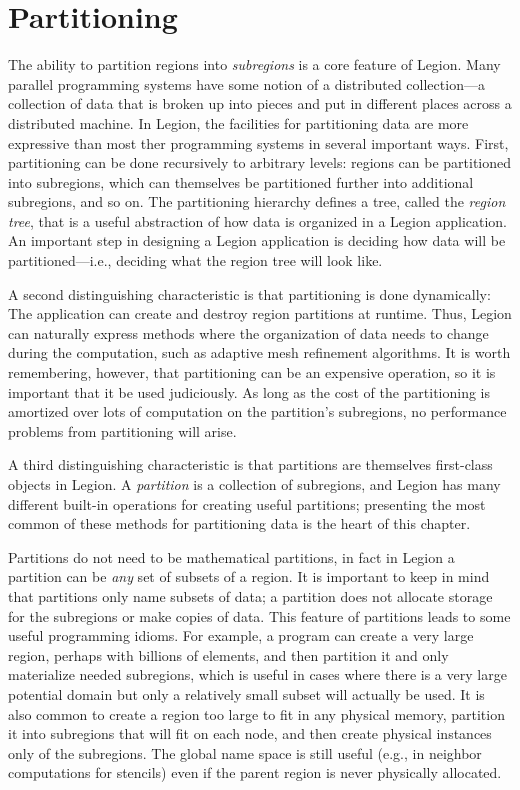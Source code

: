 \chapter{Partitioning}
\label{chap:partitioning}

The ability to partition regions into {\em subregions} is a core
feature of Legion.  Many parallel programming systems have some notion
of a distributed collection---a collection of data that is broken up
into pieces and put in different places across a distributed machine.  In
Legion, the facilities for partitioning data are more expressive than most
ther programming systems in
several important ways.  First, partitioning can be done recursively
to arbitrary levels: regions can be partitioned into subregions, which
can themselves be partitioned further into additional
subregions, and
so on.  The partitioning hierarchy defines a tree, called the {\em
  region tree}, that is a useful abstraction of how data is organized
in a Legion application.  An important step in designing a Legion
application is deciding how data will be partitioned---i.e., deciding
what the region tree will look like.

A second distinguishing characteristic is that partitioning is done dynamically: The application can create and destroy region partitions at runtime.  Thus, Legion can naturally express methods where the organization of data needs to change during the computation, such as adaptive mesh refinement algorithms.  It is worth remembering, however, that partitioning can be an expensive operation, so it is important that it be used judiciously.  As long as the cost of the partitioning is amortized over lots of computation on the partition's subregions, no performance problems from partitioning will arise.

A third distinguishing characteristic is that partitions are themselves first-class objects in Legion.  A {\em partition} is a collection of subregions, and Legion
has many different built-in operations for creating useful partitions; presenting the
most common of these methods for partitioning data is the heart of this chapter.

Partitions do not need to be mathematical partitions, in fact
in Legion a partition can be {\em any} set of subsets of a region.
It is important to keep in mind that partitions only name subsets of data;
a partition does not allocate storage for the subregions or make copies of data.
This feature of partitions leads to some useful programming idioms.  For example, a program
can create a very large region, perhaps with billions of elements, and
then partition it and only materialize needed subregions, which is useful
in cases where there is a very large potential domain but only a relatively
small subset will actually be used.  It is also common to create a region
too large to fit in any physical memory, partition it into subregions that will
fit on each node, and then create physical instances only of the subregions.
The global name space is still useful (e.g., in neighbor computations for stencils)
even if the parent region is never physically allocated.

